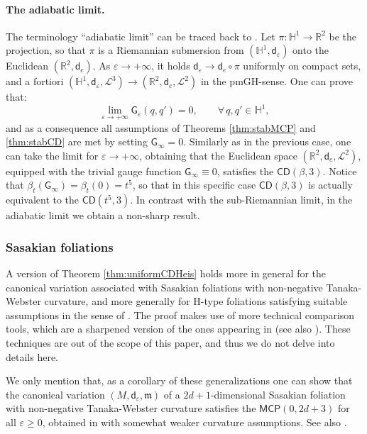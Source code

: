 \documentclass[11pt,a4paper]{article}
\theoremstyle{plain}
\theoremstyle{definition}
\theoremstyle{remark}
\numberwithin{equation}{section}
\newcommand{\R}{\mathbb{R}} %
\renewcommand{\H}{\mathbb{H}}
\newcommand{\CD}{\mathsf{CD}}
\newcommand{\MCP}{\mathsf{MCP}}
\newcommand{\mm}{\mathfrak m}
\newcommand{\sfd}{\mathsf d}
\newcommand{\sfG}{\mathsf G}
\begin{document}
\paragraph{The adiabatic limit.} The terminology ``adiabatic limit'' can be traced back to \cite{W-anomalies}. Let $\pi:\H^1\to \R^2$ be the projection, so that $\pi$ is a Riemannian submersion from $(\H^1,\sfd_\varepsilon)$ onto the Euclidean $(\R^2,\sfd_{e})$. As $\varepsilon \to +\infty$, it holds $\sfd_\varepsilon \to \sfd_e \circ \pi$ uniformly on compact sets, and a fortiori $(\H^1,\sfd_\varepsilon,\mathscr{L}^3) \to (\R^2,\sfd_{e},\mathscr{L}^2)$ in the pmGH-sense.
One can prove that:
\begin{equation}
\lim_{\varepsilon \to +\infty} \sfG_\varepsilon(q,q') =0, \qquad \forall\, q,q'\in \H^1,
\end{equation}
and as a consequence all assumptions of Theorems \ref{thm:stabMCP} and \ref{thm:stabCD} are met by setting $\sfG_\infty =0$. Similarly as in the previous case, one can take the limit for $\varepsilon\to +\infty$, obtaining that the Euclidean space $(\R^2,\sfd_e,\mathscr{L}^2)$, equipped with the trivial gauge function $\sfG_\infty \equiv 0$, satisfies the $\CD(\beta,3)$. Notice that $\beta_t(\sfG_\infty) = \beta_t(0) = t^5$, so that in this specific case $\CD(\beta,3)$ is actually equivalent to the $\CD(t^5,3)$. In contrast with the sub-Riemannian limit, in the adiabatic limit we obtain a non-sharp result.

\subsubsection{Sasakian foliations}

A version of Theorem \ref{thm:uniformCDHeis} holds more in general for the canonical variation associated with Sasakian foliations with non-negative Tanaka-Webster curvature, and more generally for H-type foliations satisfying suitable assumptions in the sense of \cite{BGMR-Htype}. The proof makes use of more technical comparison tools, which are a sharpened version of the ones appearing in \cite{BGMR-Htype} (see also \cite{BGKT-Sasakian}). These techniques are out of the scope of this paper, and thus we do not delve into details here.

We only mention that, as a corollary of these generalizations one can show that the canonical variation $(M,\sfd_\varepsilon,\mm)$ of a $2d+1$-dimensional Sasakian foliation with non-negative Tanaka-Webster curvature satisfies the $\MCP(0,2d+3)$ for all $\varepsilon\geq 0$, obtained in \cite{PL-senzamani} with somewhat weaker curvature assumptions. See also \cite[Thm. 3.11]{BGKT-Sasakian}.
\end{document}
